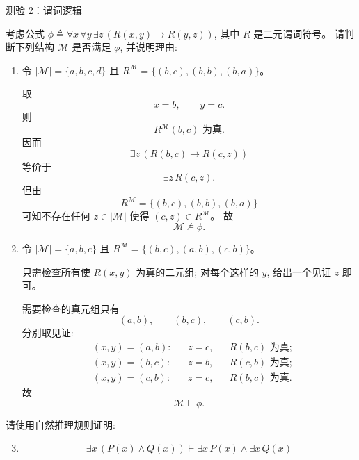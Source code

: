 \begin{frame}[allowframebreaks]{测验 2：谓词逻辑}
\begin{problem}[一阶谓词逻辑公式的语义]
  考虑公式 $\phi \triangleq \forall x\, \forall y\, \exists z\, (R(x, y) \to R(y, z))$,
  其中 $R$ 是二元谓词符号。
  请判断下列结构 $\mathcal{M}$ 是否满足 $\phi$,
  并说明理由:
  \begin{enumerate}[(1)]
    \item 令 $|\mathcal{M}| = \{a, b, c, d\}$ 且
      $R^{\mathcal{M}} = \{(b, c), (b, b), (b, a)\}$。
      \begin{solution}
        取
        \[
          x = b, \qquad y = c.
        \]
        则
        \[
          R^{\mathcal{M}}(b, c) \text{ 为真}.
        \]
        因而
        \[
          \exists z\, (R(b, c) \to R(c, z))
        \]
        等价于
        \[
          \exists z\, R(c, z).
        \]
        但由
        \[
          R^{\mathcal{M}} = \{(b, c), (b, b), (b, a)\}
        \]
        可知不存在任何 $z \in |\mathcal{M}|$ 使得 $(c, z) \in R^{\mathcal{M}}$。
        故
        \[
          \mathcal{M} \not\models \phi.
        \]
      \end{solution}
    \item 令 $|\mathcal{M}| = \{a, b, c\}$ 且
      $R^{\mathcal{M}} = \{(b, c), (a, b), (c, b)\}$。
      \begin{solution}
        只需检查所有使 $R(x, y)$ 为真的二元组;
        对每个这样的 $y$, 给出一个见证 $z$ 即可。

        需要检查的真元组只有
        \[
          (a, b), \qquad (b, c), \qquad (c, b).
        \]
        分別取见证:
        \begin{align*}
          &(x, y) = (a, b): && z = c, && R(b, c) \text{ 为真}; \\
          &(x, y) = (b, c): && z = b, && R(c, b) \text{ 为真}; \\
          &(x, y) = (c, b): && z = c, && R(b, c) \text{ 为真}.
        \end{align*}
        故
        \[
          \mathcal{M} \models \phi.
        \]
      \end{solution}
  \end{enumerate}
\end{problem}

\begin{problem}[一阶谓词逻辑的自然推理系统]
  请使用自然推理规则证明:

  \begin{enumerate}[(1)]
    \setcounter{enumi}{2}
    \item
      \[
        \exists x\, (P(x) \land Q(x)) \vdash \exists x\, P(x) \land \exists x\, Q(x)
      \]
  \end{enumerate}
\end{problem}


\end{frame}
